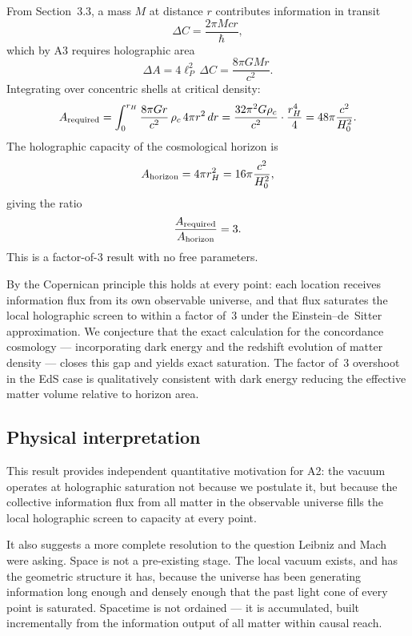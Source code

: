 \documentclass[12pt]{article}
\begin{document}
From Section~3.3, a mass $M$ at distance $r$ contributes information
in transit
\begin{equation}
  \Delta C = \frac{2\pi Mcr}{\hbar},
  \label{eq:app-transit}
\end{equation}
which by A3 requires holographic area
\begin{equation}
  \Delta A = 4\ell_P^2\,\Delta C = \frac{8\pi GMr}{c^2}.
  \label{eq:app-deltaA}
\end{equation}
Integrating over concentric shells at critical density:
\begin{equation}
  A_{\rm required}
  = \int_0^{r_H}\frac{8\pi Gr}{c^2}\,\rho_c\,4\pi r^2\,dr
  = \frac{32\pi^2 G\rho_c}{c^2}\cdot\frac{r_H^4}{4}
  = 48\pi\frac{c^2}{H_0^2}.
  \label{eq:app-required}
\end{equation}
The holographic capacity of the cosmological horizon is
\begin{equation}
  A_{\rm horizon} = 4\pi r_H^2 = 16\pi\frac{c^2}{H_0^2},
  \label{eq:app-horizon}
\end{equation}
giving the ratio
\begin{equation}
  \frac{A_{\rm required}}{A_{\rm horizon}} = 3.
  \label{eq:app-ratio}
\end{equation}
This is a factor-of-3 result with no free parameters.

By the Copernican principle this holds at every point: each location
receives information flux from its own observable universe, and that
flux saturates the local holographic screen to within a factor of~3
under the Einstein--de~Sitter approximation.
We conjecture that the exact calculation for the concordance cosmology
--- incorporating dark energy and the redshift evolution of matter
density --- closes this gap and yields exact saturation.
The factor of~3 overshoot in the EdS case is qualitatively consistent
with dark energy reducing the effective matter volume relative to
horizon area.

\subsection*{Physical interpretation}

This result provides independent quantitative motivation for A2:
the vacuum operates at holographic saturation not because we
postulate it, but because the collective information flux from all
matter in the observable universe fills the local holographic screen
to capacity at every point.

It also suggests a more complete resolution to the question Leibniz
and Mach were asking.
Space is not a pre-existing stage.
The local vacuum exists, and has the geometric structure it has,
because the universe has been generating information long enough and
densely enough that the past light cone of every point is saturated.
Spacetime is not ordained --- it is accumulated, built incrementally
from the information output of all matter within causal reach.
\end{document}
